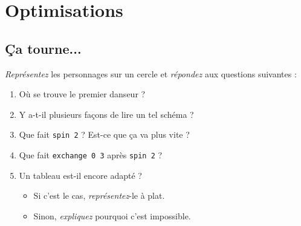 \section{Optimisations}
\begin{comment}
Grâce à vous, Noël se passera bien pour notre ami.
Il nous doit une \emph{reconnaissance éternelle}
mais il a encore un <<~petit quelque chose~>> à nous demander.

Il a entendu dire que
Sa~Majesté se lassait de tout ça et qu'elle avait décidé de changer les règles :
pendant le prochain milliard d'années (ils vivent tous très longtemps mais la
principale cause de mortalité est la décapitation), l'Élu
(qu'Elle essaiera de ne pas exécuter entre-temps, Elle fera un effort)
participera à sa place et ils reprendront du même endroit l'année suivante.
La danse ne changera pas (quel intérêt si Elle ne regarde pas ?).
Le chorégraphe doit maintenant prédire la position exacte des danseurs après
tout ce temps. S'il se trompe, il sera exécuté, lui et toute sa famille.
\end{comment}

\subsection{Ça tourne...}

\begin{exo}
\emph{Représentez} les personnages sur un cercle et
\emph{répondez} aux questions suivantes :
\begin{enumerate}
\item Où se trouve le premier danseur ?
\item Y a-t-il plusieurs façons de lire un tel schéma ?
\item Que fait \texttt{spin 2} ? Est-ce que ça va plus vite ?
\item Que fait \texttt{exchange 0 3} après \texttt{spin 2} ?
\item Un tableau est-il encore adapté ?
	\begin{itemize}
	\item Si c'est le cas, \emph{représentez}-le à plat.
	\item Sinon, \emph{expliquez} pourquoi c'est impossible.
	\end{itemize}
\end{enumerate}
\end{exo}

